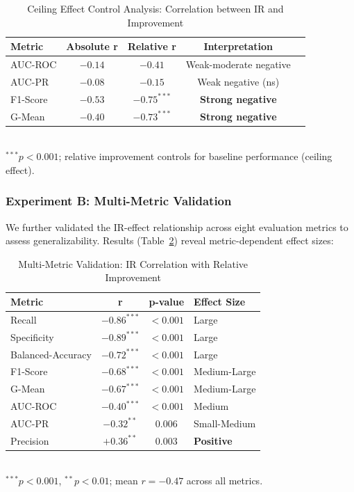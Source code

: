 \documentclass[12pt,a4paper]{article}
\theoremstyle{definition}
\begin{document}
\begin{table}[!ht]
 \centering
 \caption{Ceiling Effect Control Analysis: Correlation between IR and Improvement}
 \label{tab:validation_ceiling}
 \begin{tabular}{lcccc}
 \toprule
 \textbf{Metric} & \textbf{Absolute r} & \textbf{Relative r} & \textbf{Interpretation} \\
 \midrule
 AUC-ROC & $-0.14$ & $-0.41$ & Weak-moderate negative \\
 AUC-PR & $-0.08$ & $-0.15$ & Weak negative (ns) \\
 F1-Score & $-0.53$ & $\mathbf{-0.75}^{***}$ & \textbf{Strong negative} \\
 G-Mean & $-0.40$ & $\mathbf{-0.73}^{***}$ & \textbf{Strong negative} \\
 \bottomrule
 \end{tabular}
 \\ \small $^{***}p < 0.001$; relative improvement controls for baseline performance (ceiling effect).
\end{table}

\subsubsection{Experiment B: Multi-Metric Validation}
We further validated the IR-effect relationship across eight evaluation metrics to assess generalizability. Results (Table~\ref{tab:validation_metrics}) reveal metric-dependent effect sizes:

\begin{table}[!ht]
 \centering
 \caption{Multi-Metric Validation: IR Correlation with Relative Improvement}
 \label{tab:validation_metrics}
 \begin{tabular}{lccl}
 \toprule
 \textbf{Metric} & \textbf{r} & \textbf{p-value} & \textbf{Effect Size} \\
 \midrule
 Recall & $\mathbf{-0.86}^{***}$ & $<0.001$ & Large \\
 Specificity & $\mathbf{-0.89}^{***}$ & $<0.001$ & Large \\
 Balanced-Accuracy & $\mathbf{-0.72}^{***}$ & $<0.001$ & Large \\
 F1-Score & $\mathbf{-0.68}^{***}$ & $<0.001$ & Medium-Large \\
 G-Mean & $\mathbf{-0.67}^{***}$ & $<0.001$ & Medium-Large \\
 AUC-ROC & $-0.40^{***}$ & $<0.001$ & Medium \\
 AUC-PR & $-0.32^{**}$ & $0.006$ & Small-Medium \\
 Precision & $\mathbf{+0.36}^{**}$ & $0.003$ & \textbf{Positive} \\
 \bottomrule
 \end{tabular}
 \\ \small $^{***}p < 0.001$, $^{**}p < 0.01$; mean $r = -0.47$ across all metrics.
\end{table}
\end{document}
